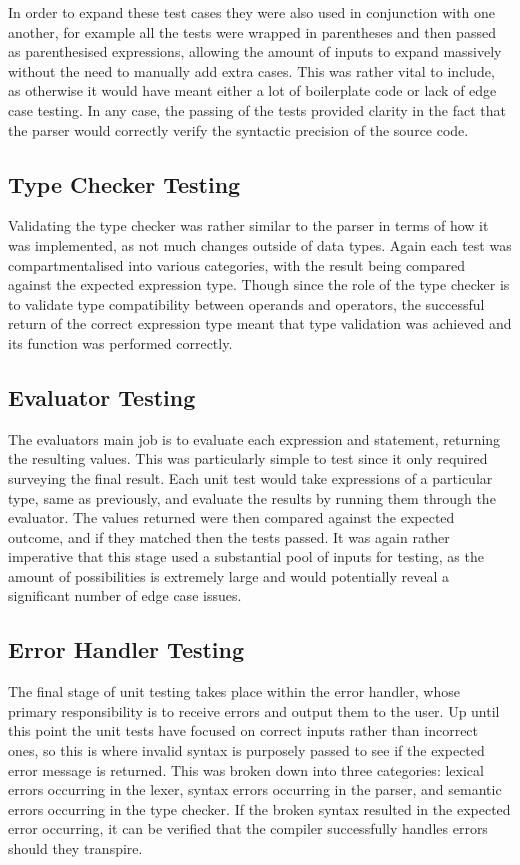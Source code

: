 \documentclass[
]{report}
\begin{document}
In order to expand these test cases they were also used in conjunction
with one another, for example all the tests were wrapped in parentheses
and then passed as parenthesised \glspl{expression}, allowing the amount of
inputs to expand massively without the need to manually add extra cases.
This was rather vital to include, as otherwise it would have meant
either a lot of boilerplate code or lack of edge case testing. In any
case, the passing of the tests provided clarity in the fact that the
parser would correctly verify the syntactic precision of the source
code.

\subsection{Type Checker Testing}
Validating the type checker was rather similar to the parser in terms of
how it was implemented, as not much changes outside of data types. Again
each test was compartmentalised into various categories, with the result
being compared against the expected \gls{expression} type. Though since the
role of the type checker is to validate type compatibility between
operands and operators, the successful return of the correct \gls{expression}
type meant that type validation was achieved and its function was
performed correctly.

\subsection{Evaluator Testing}
The evaluators main job is to evaluate each \gls{expression} and \gls{statement},
returning the resulting values. This was particularly simple to test
since it only required surveying the final result. Each unit test would
take \glspl{expression} of a particular type, same as previously, and evaluate
the results by running them through the evaluator. The values returned
were then compared against the expected outcome, and if they matched
then the tests passed. It was again rather imperative that this stage
used a substantial pool of inputs for testing, as the amount of
possibilities is extremely large and would potentially reveal a
significant number of edge case issues.

\subsection{Error Handler Testing}
The final stage of unit testing takes place within the error handler,
whose primary responsibility is to receive errors and output them to the
user. Up until this point the unit tests have focused on correct inputs
rather than incorrect ones, so this is where invalid syntax is purposely
passed to see if the expected error message is returned. This was broken
down into three categories: lexical errors occurring in the lexer,
syntax errors occurring in the parser, and semantic errors occurring in
the type checker. If the broken syntax resulted in the expected error
occurring, it can be verified that the compiler successfully handles
errors should they transpire.
\end{document}
